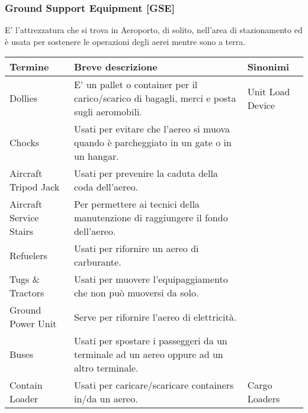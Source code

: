 \enlargethispage{1\linewidth}
\begin{landscape}
\subsubsection{Ground Support Equipment [GSE]}

\textsf{\small E' l'attrezzatura che si trova in Aeroporto, di solito, nell'area di stazionamento ed è usata per sostenere le operazioni degli aerei mentre sono a terra. }


\begin{table}[htp]
	\centering
	{\small %
		\begin{tabular}{p{}p{}p{}}
			\rowcolor{airforceblue}
			\textbf{\color{white}Termine} & \textbf{\color{white}Breve descrizione} & \textbf{\color{white}Sinonimi} \\
			\hline			
			\textsf{\small Dollies} & \textsf{\small E' un pallet o container per il carico/scarico di bagagli, merci e posta sugli aeromobili.} & \textsf{\small Unit Load Device} \\
			\hline
			\textsf{\small Chocks} & \textsf{\small Usati per evitare che l'aereo si muova quando è parcheggiato in un gate o in un hangar.} & \textsf{\small } \\
			\hline
			\textsf{\small Aircraft Tripod Jack} & \textsf{\small Usati per prevenire la caduta della coda dell'aereo.} & \textsf{\small } \\
			\hline
			\textsf{\small Aircraft Service Stairs} & \textsf{\small Per permettere ai tecnici della manutenzione di raggiungere il fondo dell'aereo.} & \textsf{\small } \\
			\hline
			\textsf{\small Refuelers} & \textsf{\small Usati per rifornire un aereo di carburante.} & \textsf{\small } \\
			\hline
			\textsf{\small Tugs \& Tractors} & \textsf{\small Usati per muovere l'equipaggiamento che non può muoversi da solo.} & \textsf{\small } \\
			\hline
			\textsf{\small Ground Power Unit} & \textsf{\small Serve per rifornire l'aereo di elettricità.} & \textsf{\small } \\
			\hline
			\textsf{\small Buses} & \textsf{\small Usati per spostare i passeggeri da un terminale ad un aereo oppure ad un altro terminale.} & \textsf{\small } \\
			\hline
			\textsf{\small Contain Loader} & \textsf{\small Usati per caricare/scaricare containers in/da un aereo.} & \textsf{\small Cargo Loaders} \\

\end{tabular}}
\end{table}
\end{landscape}
